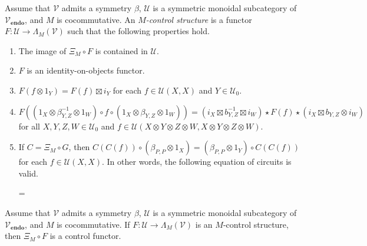 \begin{defi}
    \label{Def:ControlStruct}
    Assume that $\mathcal{V}$ admits a symmetry $\beta$, $\mathcal{U}$ is a symmetric monoidal subcategory of $\mathcal{V}_{\mathbf{endo}}$, and $M$ is cocommutative.
    An \emph{$M$-control structure} is a functor $F: \mathcal{U} \to \Lambda_M( \mathcal{V} )$ such that the following properties hold.
    \begin{enumerate}
    \item The image of $\Xi_M \circ F$ is contained in $\mathcal{U}$.
    \item $F$ is an identity-on-objects functor.
    \item $F( f \otimes 1_Y ) = F( f ) \boxtimes i_Y$ for each $f \in \mathcal{U}( X, X )$ and $Y \in \mathcal{U}_0$.
    \item $F( ( 1_X \otimes \beta_{Y,Z}^{-1} \otimes 1_W ) \circ f \circ ( 1_X \otimes \beta_{Y,Z} \otimes 1_W ) ) = ( i_X \boxtimes b_{Y,Z}^{-1} \boxtimes i_W ) \star F( f ) \star ( i_X \boxtimes b_{Y,Z} \otimes i_W )$ for all $X, Y, Z, W \in \mathcal{U}_0$ and $f \in \mathcal{U}( X \otimes Y \otimes Z \otimes W, X \otimes Y \otimes Z \otimes W )$.
    \item If $C = \Xi_M \circ G$, then $C( C( f ) ) \circ ( \beta_{P,P} \otimes 1_X ) = ( \beta_{P,P} \otimes 1_Y ) \circ C( C( f ) )$ for each $f \in \mathcal{U}( X, X )$.
          In other words, the following equation of circuits is valid.
        \begin{center}
            
            =
            
        \end{center}
    \end{enumerate}
\end{defi}

\begin{thm}
    \label{Thm:ControlStructs}
    Assume that $\mathcal{V}$ admits a symmetry $\beta$, $\mathcal{U}$ is a symmetric monoidal subcategory of $\mathcal{V}_{\mathbf{endo}}$, and $M$ is cocommutative.
    If $F: \mathcal{U} \to \Lambda_M( \mathcal{V} )$ is an $M$-control structure, then $\Xi_M \circ F$ is a control functor.
\end{thm}

